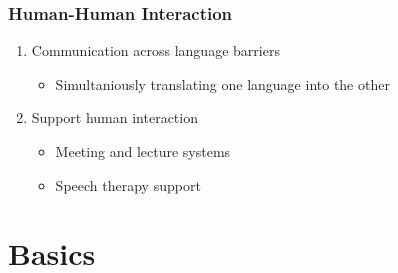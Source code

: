 \documentclass[11pt]{article}
\begin{document}
\subsubsection{Human-Human Interaction}
\begin{enumerate}
\item Communication across language barriers
\begin{itemize}
\item Simultaniously translating one language into the other
\end{itemize}

\item Support human interaction
\begin{itemize}
\item Meeting and lecture systems
\item Speech therapy support

\end{itemize}


\end{enumerate}



\section{Basics}
\end{document}
